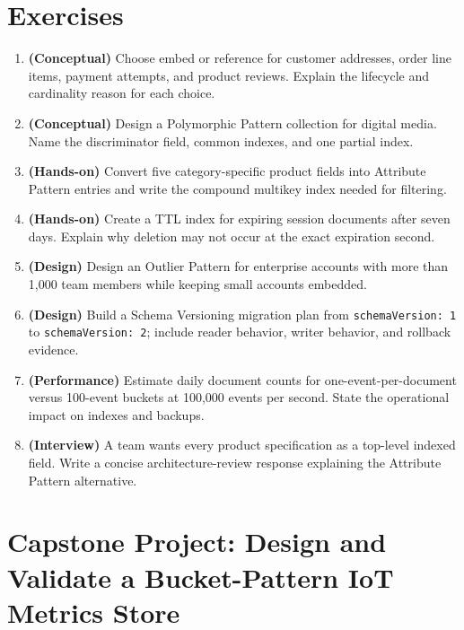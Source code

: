 \section{Exercises}
\begin{enumerate}
    \item \textbf{(Conceptual)} Choose embed or reference for customer addresses, order line items, payment attempts, and product reviews. Explain the lifecycle and cardinality reason for each choice.
    \item \textbf{(Conceptual)} Design a Polymorphic Pattern collection for digital media. Name the discriminator field, common indexes, and one partial index.
    \item \textbf{(Hands-on)} Convert five category-specific product fields into Attribute Pattern entries and write the compound multikey index needed for filtering.
    \item \textbf{(Hands-on)} Create a TTL index for expiring session documents after seven days. Explain why deletion may not occur at the exact expiration second.
    \item \textbf{(Design)} Design an Outlier Pattern for enterprise accounts with more than 1,000 team members while keeping small accounts embedded.
    \item \textbf{(Design)} Build a Schema Versioning migration plan from \texttt{schemaVersion: 1} to \texttt{schemaVersion: 2}; include reader behavior, writer behavior, and rollback evidence.
    \item \textbf{(Performance)} Estimate daily document counts for one-event-per-document versus 100-event buckets at 100,000 events per second. State the operational impact on indexes and backups.
    \item \textbf{(Interview)} A team wants every product specification as a top-level indexed field. Write a concise architecture-review response explaining the Attribute Pattern alternative.
\end{enumerate}

\section{Capstone Project: Design and Validate a Bucket-Pattern IoT Metrics Store}\label{sec:ch2-capstone}

